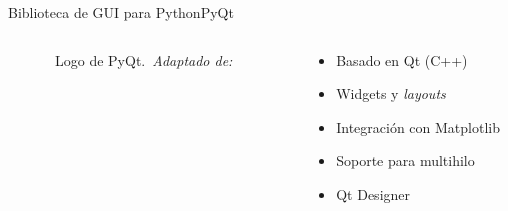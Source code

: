 \begin{frame}{Biblioteca de GUI para Python}{PyQt}
    \begin{columns}
        \begin{column}{0.4\textwidth}
            \centering
            \begin{figure}[H]
                \centering
                \vspace{-0.25cm}
                \caption{\tiny~Logo de PyQt.~\textit{Adaptado de:}~\cite{qt_wiki}}%
                \label{fig:PyQt_logo}
            \end{figure}
        \end{column}
        \begin{column}{0.6\textwidth}
            \begin{itemize}
                \item Basado en Qt (C++)
                \item Widgets y \textit{layouts}
                \item Integración con Matplotlib
                \item Soporte para multihilo
                \item Qt Designer
            \end{itemize}
        \end{column}
    \end{columns}
\end{frame}

